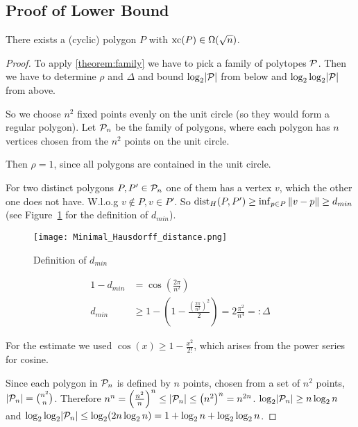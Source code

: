 \subsection{Proof of Lower Bound}

\begin{corollary}\label{corollary:lower-bound}
  There exists a (cyclic) polygon $P$ with $\xc(P) \in \Omega(\sqrt{n})$.
\end{corollary}
\begin{proof}
  To apply \ref{theorem:family} we have to pick a family of polytopes $\P$. Then we have to determine $\rho$ and $\Delta$ and bound $\log_2 \abs{\P}$ from below and $\log_2 \log_2 \abs{\P}$ from above.

  So we choose $n^2$ fixed points evenly on the unit circle (so they would form a regular polygon). Let $\P_n$ be the family of polygons, where each polygon has $n$ vertices chosen from the $n^2$ points on the unit circle.

  Then $\rho = 1$, since all polygons are contained in the unit circle.

  For two distinct polygons $P, P' \in \P_n$ one of them has a vertex $v$, which the other one does not have. W.l.o.g $v \notin P, v \in P'$. So $\dist_H(P,P') \geq \inf_{p \in P} \norm{v-p} \geq d_{min}$ (see Figure~\ref{fig:distance} for the definition of $d_{min}$).

  \begin{figure}[h]
    \centering
    \texttt{[image: Minimal\_Hausdorff\_distance.png]}
    \caption{Definition of $d_{min}$}
    \label{fig:distance}
  \end{figure}

  \begin{align*}
    1 - d_{min} &= \cos\left( \frac{2 \pi}{n^2} \right)\\
    d_{min} &\geq 1 - \left(1 - \frac{\left(\frac{2 \pi}{n^2}\right)^2}{2} \right) = 2 \frac{\pi^2}{n^4} =: \Delta
  \end{align*}

  For the estimate we used $\cos(x) \geq 1 - \frac{x^2}{2!}$, which arises from the power series for cosine.

  Since each polygon in $\P_n$ is defined by $n$ points, chosen from a set of $n^2$ points, $\abs{\P_n} = \binom{n^2}{n}$. Therefore $n^n = \left( \frac{n^2}{n} \right)^n \leq \abs{\P_n} \leq \left( n^2 \right)^n = n^{2n}$. $\log_2 \abs{\P_n} \geq n \log_2 n$ and $\log_2 \log_2 \abs{\P_n} \leq \log_2 (2n \log_2 n) = 1 + \log_2 n + \log_2 \log_2 n$.


\end{proof}
